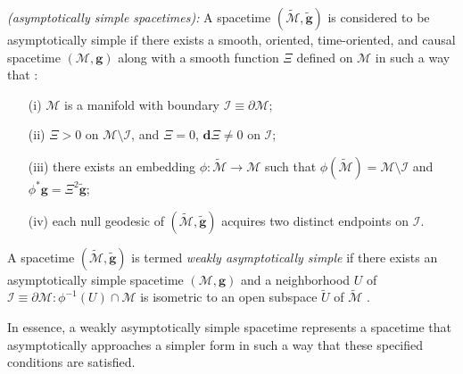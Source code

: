 \begin{mydefinition}\label{def:asymptoticallysimple}
  \textit{(asymptotically simple spacetimes):} A spacetime $(\tilde{\mathcal{M}}, \boldsymbol{\tilde{g}})$ is considered to be asymptotically simple if there exists a smooth, oriented, time-oriented, and causal spacetime  $({\mathcal{M}},\boldsymbol{g})$ along with a smooth function $\Xi$ defined on $\mathcal{M}$ in such a way that \cite{Ste91}:
  \begin{enumerate}
    \item[(i)] $\mathcal{M}$ is a manifold with boundary $\mathcal{I} \equiv \partial \mathcal{M}$;
    \item[(ii)] $\Xi > 0$ on $\mathcal{M} \setminus \mathcal{I}$, and $\Xi = 0$, $\boldsymbol{d}\Xi \neq 0$ on $\mathcal{I}$;
    \item[(iii)] there exists an embedding $\phi: \mathcal{\tilde{M}} \rightarrow \mathcal{M}$ such that $\phi(\tilde{\mathcal{M}}) = \mathcal{M}\setminus \mathcal{I}$ and $\phi^{*}\boldsymbol{g} = \Xi^{2}\boldsymbol{\tilde{g}}$;
    \item[(iv)] each null geodesic of $(\mathcal{\tilde{M}}, \boldsymbol{\tilde{g}})$ acquires two distinct endpoints on $\mathcal{I}$.
  \end{enumerate}
\end{mydefinition}

\begin{mydefinition}\label{def:weaklyasymptoticallysimple}
  A spacetime $(\tilde{\mathcal{M}}, \boldsymbol{\tilde{g}})$ is termed \textit{weakly asymptotically simple} if there exists an asymptotically simple spacetime $(\mathcal{M}, \boldsymbol{g})$ and a neighborhood $U$ of $\mathcal{I} \equiv \partial \mathcal{M}: \phi^{-1}(U) \cap \mathcal{M}$ is isometric to an open subspace $\tilde{U}$ of $\tilde{\mathcal{M}}$ \cite{Val16}. 
\end{mydefinition}
In essence, a weakly asymptotically simple spacetime represents a spacetime that asymptotically approaches a simpler form in such a way that these specified conditions are satisfied.\\


